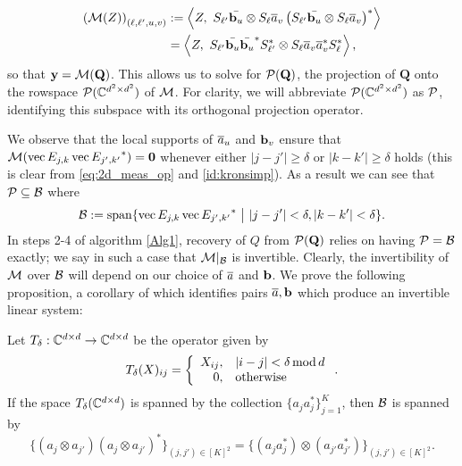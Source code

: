 \begin{equation}
  \begin{aligned}
\left(\mathcal{M}(Z) \right)_{(\ell,\ell',u,v)} &:= \left\langle  Z, ~S_{\ell'} \bar{\b_u} \otimes S_{\ell} \a_v \left(S_{\ell'} \bar{\b_u} \otimes S_{\ell} \a_v\right)^*\right\rangle \\ &= \left\langle Z, ~S_{\ell'} \bar{\b_u}\bar{\b_u}^* S^*_{\ell'} \otimes S_\ell \a_v \a_v^* S^*_\ell \right\rangle,
  \end{aligned}
  \label{eq:2d_meas_op}
\end{equation}
so that $\y = \mathcal{M}(\mathbf{Q})$.  This allows us to solve for $\Pc(\mathbf{Q})$, the projection of $\mathbf{Q}$ onto the rowspace $\Pc(\C^{d^2 \times d^2})$ of $\Mc$.  For clarity, we will abbreviate $\Pc(\C^{d^2 \times d^2})$ as $\Pc$, identifying this subspace with its orthogonal projection operator.

We observe that the local supports of $\a_u$ and $\b_v$ ensure that $\mathcal{M}( \vec{E_{j,k}} \vec{E_{j',k'}}^*) = {\bf 0}$ whenever either $|j - j'| \geq \delta$ or $|k - k'| \geq \delta$ holds (this is clear from \eqref{eq:2d_meas_op} and \eqref{id:kronsimp}).  As a result we can see that $\Pc \subset \B$ where \begin{equation} \B := \Span\{ \vec{E_{j,k}} \vec{E_{j',k'}}^* ~{\bf \big |}~  |j - j'| < \delta, |k - k'| < \delta \}. \label{eq:defB} \end{equation}  %
In steps 2-4 of algorithm \ref{Alg1}, recovery of $Q$ from $\Pc(\mathbf{Q})$ relies on having $\Pc = \B$ exactly; we say in such a case that $\Mc|_\B$ is invertible.  Clearly, the invertibility of $\Mc$ over $\B$ will depend on our choice of $\a$ and $\b$.  We prove the following proposition, a corollary of which identifies pairs $\a, \b$ which produce an invertible linear system:
\begin{proposition} \label{prop:kronspan}
  Let $T_\delta : \C^{d \times d} \to \C^{d \times d}$ be the operator given by \[T_\delta(X)_{ij} = \left\{\begin{array}{r@{,\quad}l}
  X_{ij} & |i - j| < \delta \mod d \\
  0 & \text{otherwise}\end{array}\right..\]
  If the space $T_{\delta}(\C^{d \times d})$ is spanned by the collection $\{a_j a_j^*\}_{j=1}^K$, then $\B$ is spanned by \[\{(a_j \otimes a_{j'}) (a_j \otimes a_{j'})^*\}_{(j, j') \in [K]^2} = \{(a_j a_j^*) \otimes (a_{j'} a_{j'}^*)\}_{(j, j') \in [K]^2}.\]
\end{proposition}

